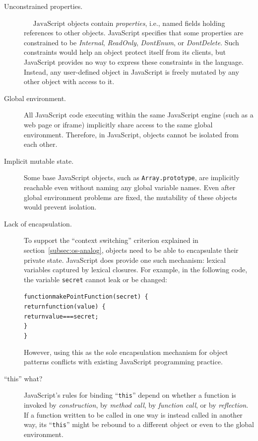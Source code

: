 \documentclass[letterpaper,twocolumn,10pt]{article}
\newcommand{\code}[1]{{\tt {#1}}}              %
\begin{document}
\begin{description}

  \item[Unconstrained properties.] $\mbox{~~~~JavaScript objects}$ contain 
  \emph{properties}, i.e., named fields holding references to other objects. 
  JavaScript specifies that some properties are constrained to be 
  \emph{Internal}, \emph{ReadOnly}, \emph{DontEnum}, or \emph{DontDelete}. 
  Such constraints would help an object protect itself from its clients, but 
  JavaScript provides no way to express these constraints in the language. 
  Instead, any user-defined object in JavaScript is freely mutated by any other 
  object with access to it.
  
  \item[Global environment.] All JavaScript code executing within the same 
  JavaScript engine (such as a web page or iframe) implicitly share access to 
  the same global environment. Therefore, in JavaScript, objects cannot be 
  isolated from each other.

  \item[Implicit mutable state.] Some base JavaScript objects, such as 
  \code{Array.prototype}, are implicitly reachable even without naming any 
  global variable names. Even after global environment problems are fixed, 
  the mutability of these objects would prevent isolation.

  \item[Lack of encapsulation.] To support the ``context switching'' 
  criterion explained in section~\ref{subsec:os-analog}, objects need 
  to be able to encapsulate their private state. JavaScript does provide 
  one such mechanism: lexical variables captured by lexical closures. 
  For example, in the following code, the variable \code{secret} cannot
  leak or be changed:
\begin{alltt}
function makePointFunction(secret)\ \{
  return function(value)\ \{ 
    return value === secret;
  \}
\}  
\end{alltt}
  However, using this as the sole 
  encapsulation mechanism for object patterns conflicts with existing 
  JavaScript programming practice.

  \item[``this'' what?] JavaScript's rules for binding ``\code{this}'' depend 
  on whether a function is invoked by \emph{construction}, by \emph{method 
  call}, by \emph{function call}, or by \emph{reflection}. If a function 
  written to be called in one way is instead called in another way, its 
  ``\code{this}'' might be rebound to a different object or even to the 
  global environment.


\end{description}
\end{document}
